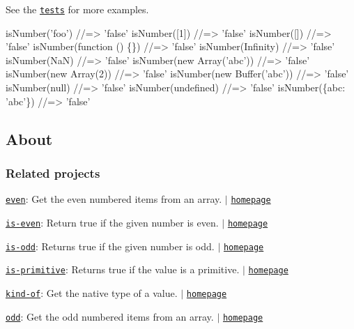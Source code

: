 See the \href{./test.js}{\tt tests} for more examples.


\begin{DoxyCode}
isNumber('foo')             //=> 'false'
isNumber([1])               //=> 'false'
isNumber([])                //=> 'false'
isNumber(function () \{\})    //=> 'false'
isNumber(Infinity)          //=> 'false'
isNumber(NaN)               //=> 'false'
isNumber(new Array('abc'))  //=> 'false'
isNumber(new Array(2))      //=> 'false'
isNumber(new Buffer('abc')) //=> 'false'
isNumber(null)              //=> 'false'
isNumber(undefined)         //=> 'false'
isNumber(\{abc: 'abc'\})      //=> 'false'
\end{DoxyCode}


\subsection*{About}

\subsubsection*{Related projects}


\begin{DoxyItemize}
\item \href{https://www.npmjs.com/package/even}{\tt even}\+: Get the even numbered items from an array. $\vert$ \href{https://github.com/jonschlinkert/even}{\tt homepage}
\item \href{https://www.npmjs.com/package/is-even}{\tt is-\/even}\+: Return true if the given number is even. $\vert$ \href{https://github.com/jonschlinkert/is-even}{\tt homepage}
\item \href{https://www.npmjs.com/package/is-odd}{\tt is-\/odd}\+: Returns true if the given number is odd. $\vert$ \href{https://github.com/jonschlinkert/is-odd}{\tt homepage}
\item \href{https://www.npmjs.com/package/is-primitive}{\tt is-\/primitive}\+: Returns {\ttfamily true} if the value is a primitive. $\vert$ \href{https://github.com/jonschlinkert/is-primitive}{\tt homepage}
\item \href{https://www.npmjs.com/package/kind-of}{\tt kind-\/of}\+: Get the native type of a value. $\vert$ \href{https://github.com/jonschlinkert/kind-of}{\tt homepage}
\item \href{https://www.npmjs.com/package/odd}{\tt odd}\+: Get the odd numbered items from an array. $\vert$ \href{https://github.com/jonschlinkert/odd}{\tt homepage}
\end{DoxyItemize}

